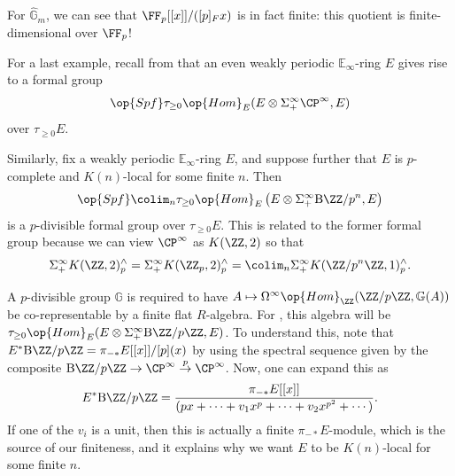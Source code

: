\documentclass[../notes.tex]{subfiles}
\begin{document}
\begin{remark}
	For $\widehat{\mathbb G}_m$, we can see that $\FF_p[[x]]/([p]_Fx)$ is in fact finite: this quotient is finite-dimensional over $\FF_p$!
\end{remark}
For a last example, recall from  that an even weakly periodic $\mathbb E_\infty$-ring $E$ gives rise to a formal group
\[\op{Spf}\tau_{\ge0}\op{Hom}_E(E\otimes\Sigma_+^\infty\CP^\infty,E)\]
over $\tau_{\ge0}E$.
\begin{example} \label{ex:quillen-p-div}
	Similarly, fix a weakly periodic $\mathbb E_\infty$-ring $E$, and suppose further that $E$ is $p$-complete and $K(n)$-local for some finite $n$. Then
	\[\op{Spf}\colim_n\tau_{\ge0}\op{Hom}_E\left(E\otimes\Sigma_+^\infty\mathrm B\ZZ/p^n,E\right)\]
	is a $p$-divisible formal group over $\tau_{\ge0}E$. This is related to the former formal group because we can view $\CP^\infty$ as $K(\ZZ,2)$ so that
	\[\Sigma_+^\infty K(\ZZ,2)^\land_p=\Sigma_+^\infty K(\ZZ_p,2)^\land_p=\colim_n\Sigma_+^\infty K(\ZZ/p^n\ZZ,1)^\land_p.\]
\end{example}
\begin{remark}
	A $p$-divisible group $\mathbb G$ is required to have $A\mapsto\Omega^\infty\op{Hom}_\ZZ(\ZZ/p\ZZ,\mathbb G(A))$ be co-represent\-able by a finite flat $R$-algebra. For , this algebra will be $\tau_{\ge0}\op{Hom}_E(E\otimes\Sigma_+^\infty\mathrm B\ZZ/p\ZZ,E)$. To understand this, note that $E^*\mathrm B\ZZ/p\ZZ=\pi_{-*}E[[x]]/[p](x)$ by using the spectral sequence given by the composite $\mathrm B\ZZ/p\ZZ\to\CP^\infty\stackrel p\to\CP^\infty$. Now, one can expand this as
	\[E^*\mathrm B\ZZ/p\ZZ=\frac{\pi_{-*}E[[x]]}{\left(px+\cdots+v_1x^p+\dots+v_2x^{p^2}+\cdots\right)}.\]
	If one of the $v_i$ is a unit, then this is actually a finite $\pi_{-*}E$-module, which is the source of our finiteness, and it explains why we want $E$ to be $K(n)$-local for some finite $n$.
\end{remark}
\end{document}
